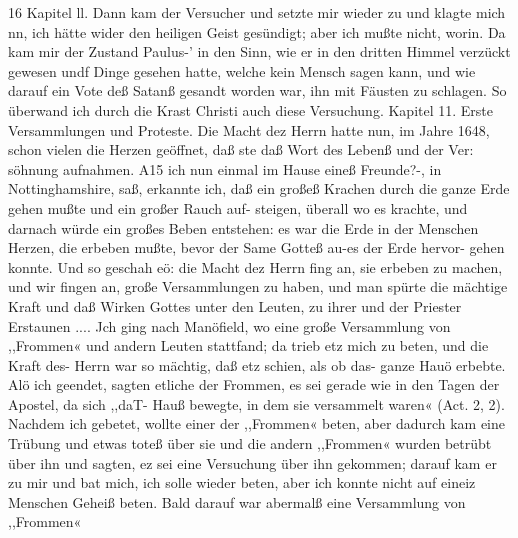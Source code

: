 16 Kapitel ll.
Dann kam der Versucher und setzte mir wieder zu und
klagte mich nn, ich hätte wider den heiligen Geist gesündigt; aber
ich mußte nicht, worin. Da kam mir der Zustand Paulus-’ in
den Sinn, wie er in den dritten Himmel verzückt gewesen undf
Dinge gesehen hatte, welche kein Mensch sagen kann, und wie
darauf ein Vote deß Satanß gesandt worden war, ihn mit
Fäusten zu schlagen. So überwand ich durch die Krast Christi
auch diese Versuchung.
Kapitel 11.
Erste Versammlungen und Proteste.
Die Macht dez Herrn hatte nun, im Jahre 1648, schon vielen
die Herzen geöffnet, daß ste daß Wort des Lebenß und der Ver:
söhnung aufnahmen. A15 ich nun einmal im Hause eineß Freunde?-,
in Nottinghamshire, saß, erkannte ich, daß ein großeß Krachen
durch die ganze Erde gehen mußte und ein großer Rauch auf-
steigen, überall wo es krachte, und darnach würde ein großes
Beben entstehen: es war die Erde in der Menschen Herzen, die
erbeben mußte, bevor der Same Gotteß au-es der Erde hervor-
gehen konnte. Und so geschah eö: die Macht dez Herrn fing an,
sie erbeben zu machen, und wir fingen an, große Versammlungen
zu haben, und man spürte die mächtige Kraft und daß Wirken
Gottes unter den Leuten, zu ihrer und der Priester Erstaunen ....
Jch ging nach Manöfield, wo eine große Versammlung von
,,Frommen« und andern Leuten stattfand; da trieb etz mich zu
beten, und die Kraft des- Herrn war so mächtig, daß etz schien,
als ob das- ganze Hauö erbebte. Alö ich geendet, sagten etliche
der Frommen, es sei gerade wie in den Tagen der Apostel, da
sich ,,daT- Hauß bewegte, in dem sie versammelt waren« (Act. 2, 2).
Nachdem ich gebetet, wollte einer der ,,Frommen« beten, aber
dadurch kam eine Trübung und etwas toteß über sie und die
andern ,,Frommen« wurden betrübt über ihn und sagten, ez sei
eine Versuchung über ihn gekommen; darauf kam er zu mir und
bat mich, ich solle wieder beten, aber ich konnte nicht auf eineiz
Menschen Geheiß beten.
Bald darauf war abermalß eine Versammlung von ,,Frommen«


